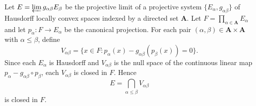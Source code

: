 Let $E = \varprojlim g_{\alpha\beta} E_\beta$ be the projective limit of a projective system $\{E_\alpha, g_{\alpha\beta}\}$ of Hausdorff locally convex spaces indexed by a directed set $\mathbf{A}$. Let $F = \prod_{\alpha \in \mathbf{A}} E_\alpha$ and let $p_\alpha \colon F \to E_\alpha$ be the canonical projection. For each pair $(\alpha, \beta) \in \mathbf{A} \times \mathbf{A}$ with $\alpha \leq \beta$, define
$$V_{\alpha\beta} = \{x \in F : p_\alpha(x) - g_{\alpha\beta}(p_\beta(x)) = 0\}.$$
Since each $E_\alpha$ is Hausdorff and $V_{\alpha\beta}$ is the null space of the continuous linear map $p_\alpha - g_{\alpha\beta} \circ p_\beta$, each $V_{\alpha\beta}$ is closed in $F$. Hence
$$E = \bigcap_{\alpha \leq \beta} V_{\alpha\beta}$$
is closed in $F$.

